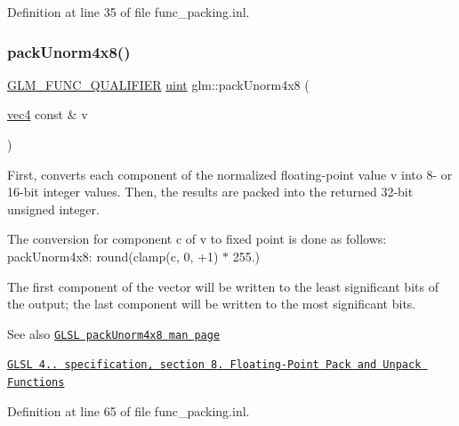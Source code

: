 Definition at line 35 of file func\+\_\+packing.\+inl.

\mbox{\label{group__core__func__packing_ga834ee9a9e73dcb0a7c1fc88143f3edb8}} 
\subsubsection{\texorpdfstring{pack\+Unorm4x8()}{packUnorm4x8()}}
{\footnotesize\ttfamily \hyperlink{setup_8hpp_a33fdea6f91c5f834105f7415e2a64407}{G\+L\+M\+\_\+\+F\+U\+N\+C\+\_\+\+Q\+U\+A\+L\+I\+F\+I\+ER} \hyperlink{group__core__precision_ga4fd29415871152bfb5abd588334147c8}{uint} glm\+::pack\+Unorm4x8 (\begin{DoxyParamCaption}\item[{\hyperlink{group__core__types_ga5881b1b022d7fd1b7218f5916532dd02}{vec4} const \&}]{v }\end{DoxyParamCaption})}

First, converts each component of the normalized floating-\/point value v into 8-\/ or 16-\/bit integer values. Then, the results are packed into the returned 32-\/bit unsigned integer.

The conversion for component c of v to fixed point is done as follows\+: pack\+Unorm4x8\+: round(clamp(c, 0, +1) $\ast$ 255.)

The first component of the vector will be written to the least significant bits of the output; the last component will be written to the most significant bits.

\begin{DoxySeeAlso}{See also}
\href{http://www.opengl.org/sdk/docs/manglsl/xhtml/packUnorm4x8.xml}{\tt G\+L\+SL pack\+Unorm4x8 man page} 

\href{http://www.opengl.org/registry/doc/GLSLangSpec.4.20.8.pdf}{\tt G\+L\+SL 4.. specification, section 8. Floating-\/\+Point Pack and Unpack Functions} 
\end{DoxySeeAlso}


Definition at line 65 of file func\+\_\+packing.\+inl.

\mbox{\label{group__core__func__packing_ga7e8cf88c278c18969c99af83bceed024}} 
